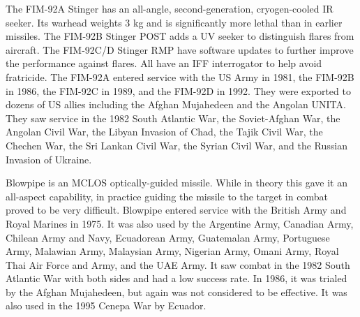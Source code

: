 \begin{withcounters}

    The FIM-92A Stinger has an all-angle, second-generation, cryogen-cooled IR seeker.
    Its warhead weights 3 kg and is significantly more lethal than in earlier missiles.
    The FIM-92B Stinger POST adds a UV seeker to distinguish flares from aircraft.
    The FIM-92C/D Stinger RMP have software updates to further improve the performance against flares.
    All have an IFF interrogator to help avoid fratricide.
    The FIM-92A entered service with the US Army in 1981, the FIM-92B in 1986, the FIM-92C in 1989, and the FIM-92D in 1992. They were exported to dozens of US allies including the Afghan Mujahedeen and the Angolan UNITA. They saw service in the 1982 South Atlantic War, the Soviet-Afghan War, the Angolan Civil War, the Libyan Invasion of Chad, the Tajik Civil War, the Chechen War, the Sri Lankan Civil War, the Syrian Civil War, and the Russian Invasion of Ukraine.%


    Blowpipe is an MCLOS optically-guided missile.
    While in theory this gave it an all-aspect capability, in practice guiding the missile to the target in combat proved to be very difficult.
    Blowpipe entered service with the British Army and Royal Marines in 1975.
    It was also used by the Argentine Army, Canadian Army, Chilean Army and Navy, Ecuadorean Army, Guatemalan Army, Portuguese Army, Malawian Army, Malaysian Army, Nigerian Army, Omani Army, Royal Thai Air Force and Army, and the UAE Army.
    It saw combat in the 1982 South Atlantic War with both sides and had a low success rate.
    In 1986, it was trialed by the Afghan Mujahedeen, but again was not considered to be effective.
    It was also used in the 1995 Cenepa War by Ecuador.%


\end{withcounters}
